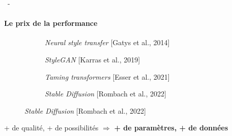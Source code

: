 \documentclass[aspectratio=169, 22pt]{beamer}
\begin{document}
\begin{frame}{\secname~- \subsecname}
  \framesubtitle{Le prix de la performance}
  \begin{figure}
    \begin{subfigure}{0.24\linewidth}
      \caption{\emph{Neural style transfer} [Gatys et al., 2014]}
    \end{subfigure}
    \begin{subfigure}{0.24\linewidth}
      \caption{\emph{StyleGAN} [Karras et al., 2019]}
    \end{subfigure}
    \begin{subfigure}{0.24\linewidth}
      \caption{\emph{Taming transformers} [Esser et al., 2021]}
    \end{subfigure}
    \begin{subfigure}{0.24\linewidth}
      \caption{\emph{Stable Diffusion} [Rombach et al., 2022]}
    \end{subfigure}
  \end{figure}
  \begin{exampleblock}{}
    \centering
    + de qualité, + de possibilités $\Rightarrow$ \textbf{+ de \alert{paramètres}, + de \alert{données}}
  \end{exampleblock}
\end{frame}
\end{document}

